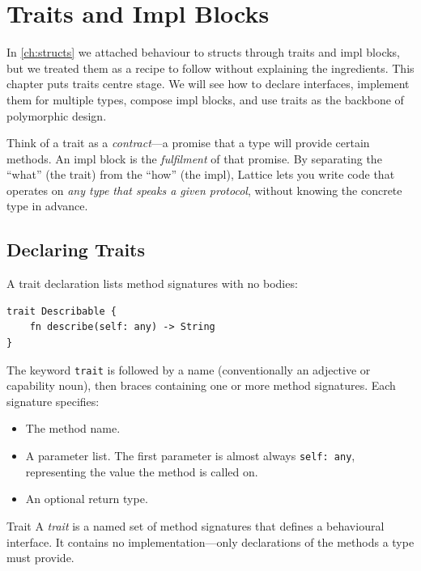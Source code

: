 \chapter{Traits and Impl Blocks}\label{ch:traits}

In \cref{ch:structs} we attached behaviour to structs through traits and
impl blocks, but we treated them as a recipe to follow without explaining
the ingredients. This chapter puts traits centre stage. We will see how to
declare interfaces, implement them for multiple types, compose impl blocks,
and use traits as the backbone of polymorphic design.

Think of a trait as a \emph{contract}---a promise that a type will provide
certain methods. An impl block is the \emph{fulfilment} of that promise. By
separating the ``what'' (the trait) from the ``how'' (the impl), Lattice
lets you write code that operates on \emph{any type that speaks a given
protocol}, without knowing the concrete type in advance.

\section{Declaring Traits}\label{sec:trait-declaring}

A trait declaration lists method signatures with no bodies:

\begin{lstlisting}[language=Lattice, caption={A trait with a single method}]
trait Describable {
    fn describe(self: any) -> String
}
\end{lstlisting}

The keyword \lstinline|trait| is followed by a name (conventionally an
adjective or capability noun), then braces containing one or more method
signatures. Each signature specifies:

\begin{itemize}
  \item The method name.
  \item A parameter list. The first parameter is almost always
    \lstinline|self: any|, representing the value the method is called on.
  \item An optional return type.
\end{itemize}

\begin{defnbox}{Trait}
A \emph{trait} is a named set of method signatures that defines a
behavioural interface. It contains no implementation---only declarations
of the methods a type must provide.
\end{defnbox}

